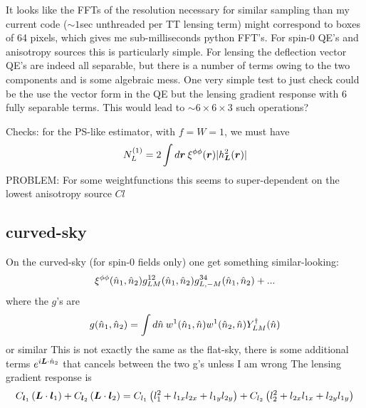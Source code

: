 \documentclass[11pt]{article}
\begin{document}
It looks like the FFTs of the resolution necessary for similar sampling than my current code ($\sim 1 $sec unthreaded per TT lensing term) might correspond to boxes of 64 pixels, which gives me sub-milliseconds python FFT's. 
For spin-0 QE's and anisotropy sources this is particularly simple. For lensing the deflection vector QE's are indeed all separable, but there is a number of terms owing to the two components and is some algebraic mess. One very simple test to just check could be the use the vector form in the QE but the lensing gradient response with 6 fully separable terms. This would lead to $\sim 6 \times 6 \times 3$ such operations?

Checks: for the PS-like estimator, with $f = W = 1$, we must have
\begin{equation}
	N_L^{(1)} = 2 \int d\boldsymbol{r} \:\xi^{\phi\phi}(\boldsymbol{r}) |h_{\boldsymbol{L}}^2(\boldsymbol{r})|
\end{equation}
PROBLEM: For some weightfunctions this seems to super-dependent on the lowest anisotropy source $Cl$

\subsection{curved-sky}
On the curved-sky (for spin-0 fields only) one get something similar-looking:
\begin{equation}
\xi^{\phi\phi}({\hat n}_1,{\hat n}_2) g^{12}_{LM}({\hat n}_1,{\hat n}_2) g^{34}_{L,-M}({\hat n}_1,{\hat n}_2) + ...
\end{equation}
where the $g$'s are
\begin{equation}
	g({\hat n}_1, {\hat n}_2) = \int d{\hat n} \:w^1({\hat n}_1, {\hat n})w^1({\hat n}_2, {\hat n}) Y^\dagger_{LM}({\hat n})
\end{equation}
or similar
\color{red} This is not exactly the same as the flat-sky, there is some additional terms $e^{i \boldsymbol{L} \cdot {\hat n}_2}$ that cancels between the two g's unless I am wrong
\color{black}
The lensing gradient response is
\begin{equation}
	C_{\boldsymbol{l}_1} \left( \boldsymbol{L} \cdot \boldsymbol{l}_1 \right) + C_{\boldsymbol{l}_2} \left( \boldsymbol{L} \cdot \boldsymbol{l}_2 \right) = C_{l_1}\left( l_1^2  + l_{1x} l_{2x} + l_{1y} l_{2y}\right) + C_{l_2}\left( l_2^2  + l_{2x} l_{1x} + l_{2y} l_{1y}\right)
\end{equation}
\end{document}
